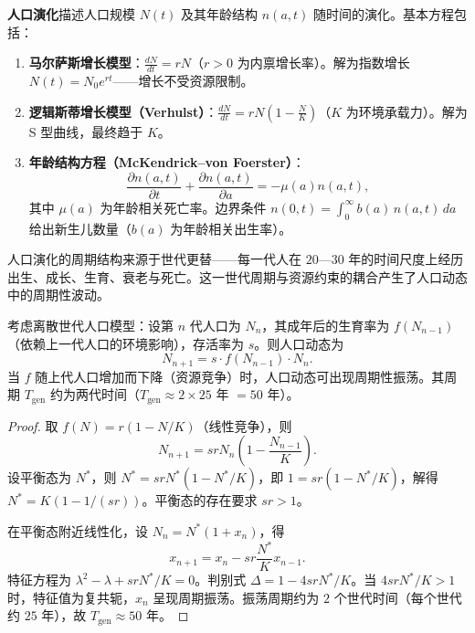 \begin{definition}[人口演化的基本模型]\label{def:population_evolution}
\textbf{人口演化}描述人口规模 $N(t)$ 及其年龄结构 $n(a,t)$ 随时间的演化。基本方程包括：
\begin{enumerate}[label=(\roman*)]
    \item \textbf{马尔萨斯增长模型}：$\frac{dN}{dt} = rN$（$r > 0$ 为内禀增长率）。解为指数增长 $N(t) = N_0 e^{rt}$——增长不受资源限制。
    \item \textbf{逻辑斯蒂增长模型（Verhulst）}：$\frac{dN}{dt} = rN\left(1 - \frac{N}{K}\right)$（$K$ 为环境承载力）。解为 S 型曲线，最终趋于 $K$。
    \item \textbf{年龄结构方程（McKendrick–von Foerster）}：
    \[
    \frac{\partial n(a,t)}{\partial t} + \frac{\partial n(a,t)}{\partial a} = -\mu(a) n(a,t),
    \]
    其中 $\mu(a)$ 为年龄相关死亡率。边界条件 $n(0,t) = \int_0^\infty b(a)\, n(a,t)\, da$ 给出新生儿数量（$b(a)$ 为年龄相关出生率）。
\end{enumerate}
人口演化的周期结构来源于世代更替——每一代人在 $20$—$30$ 年的时间尺度上经历出生、成长、生育、衰老与死亡。这一世代周期与资源约束的耦合产生了人口动态中的周期性波动。
\end{definition}

\begin{proposition}[人口动态中的世代周期]\label{prop:generational_population_cycle}
考虑离散世代人口模型：设第 $n$ 代人口为 $N_n$，其成年后的生育率为 $f(N_{n-1})$（依赖上一代人口的环境影响），存活率为 $s$。则人口动态为
\[
N_{n+1} = s \cdot f(N_{n-1}) \cdot N_n.
\]
当 $f$ 随上代人口增加而下降（资源竞争）时，人口动态可出现周期性振荡。其周期 $T_{\text{gen}}$ 约为两代时间（$T_{\text{gen}} \approx 2 \times 25$ 年 $= 50$ 年）。
\end{proposition}

\begin{proof}
取 $f(N) = r(1 - N/K)$（线性竞争），则
\[
N_{n+1} = s r N_n \left(1 - \frac{N_{n-1}}{K}\right).
\]
设平衡态为 $N^*$，则 $N^* = s r N^*(1 - N^*/K)$，即 $1 = s r (1 - N^*/K)$，解得 $N^* = K(1 - 1/(sr))$。平衡态的存在要求 $sr > 1$。

在平衡态附近线性化，设 $N_n = N^*(1 + x_n)$，得
\[
x_{n+1} = x_n - s r \frac{N^*}{K} x_{n-1}.
\]
特征方程为 $\lambda^2 - \lambda + s r N^*/K = 0$。判别式 $\Delta = 1 - 4 s r N^*/K$。当 $4 s r N^*/K > 1$ 时，特征值为复共轭，$x_n$ 呈现周期振荡。振荡周期约为 $2$ 个世代时间（每个世代约 $25$ 年），故 $T_{\text{gen}} \approx 50$ 年。
\end{proof}

